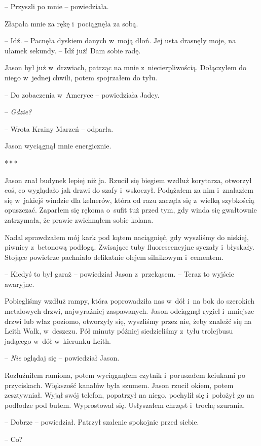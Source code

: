 \documentclass[oneside,polish,12pt,sfheadings]{mwbk}
\newcommand{\threeast}{\bigskip\par\centerline{*\,*\,*}\medskip\par}%
\begin{document}
-- Przyszli po mnie -- powiedziała. 

Złapała mnie za rękę i~pociągnęła za sobą. 

-- Idź. -- Pacnęła dyskiem danych w~moją dłoń. Jej usta drasnęły moje, na ułamek sekundy. -- Idź już! Dam sobie
radę.

Jason był już w~drzwiach, patrząc na mnie z~niecierpliwością. Dołączyłem
do niego w~jednej chwili, potem spojrzałem do tyłu.

-- Do zobaczenia w~Ameryce -- powiedziała Jadey.

-- \emph{Gdzie?}

-- Wrota Krainy Marzeń -- odparła.

Jason wyciągnął mnie energicznie.

\threeast

Jason znał budynek lepiej niż ja. Rzucił się biegiem wzdłuż korytarza,
otworzył coś, co wyglądało jak drzwi do szafy i~wskoczył. Podążałem za
nim i~znalazłem się w~jakiejś windzie dla kelnerów, która od razu
zaczęła się z~wielką szybkością opuszczać. Zaparłem się rękoma o~sufit
tuż przed tym, gdy winda się gwałtownie zatrzymała, że prawie zwichnąłem
sobie kolana.

Nadal sprawdzałem mój kark pod kątem naciągnięć, gdy wyszliśmy do
niskiej, piwnicy z~betonową podłogą. Zwisające tuby fluorescencyjne
syczały i~błyskały. Stojące powietrze pachniało delikatnie olejem
silnikowym i~cementem.

-- Kiedyś to był garaż -- powiedział Jason z~przekąsem. -- Teraz to wyjście
awaryjne.

Pobiegliśmy wzdłuż rampy, która poprowadziła nas w~dół i~na bok do
szerokich metalowych drzwi, najwyraźniej zaspawanych. Jason odciągnął
rygiel i~mniejsze drzwi lub właz poziomo, otworzyły się, wyszliśmy przez
nie, żeby znaleźć się na Leith Walk, w~deszczu. Pół minuty później
siedzieliśmy z~tyłu trolejbusu jadącego w~dół w~kierunku Leith.

-- \emph{Nie} oglądaj się -- powiedział Jason.

Rozluźniłem ramiona, potem wyciągnąłem czytnik i~poruszałem kciukami po
przyciskach. Większość kanałów była szumem. Jason rzucił okiem, potem
zesztywniał. Wyjął swój telefon, popatrzył na niego, pochylił się i~położył go na podłodze pod butem. Wyprostował się. Usłyszałem chrzęst i~trochę szurania.

-- Dobrze -- powiedział. Patrzył szalenie spokojnie przed siebie.

-- Co?
\end{document}
